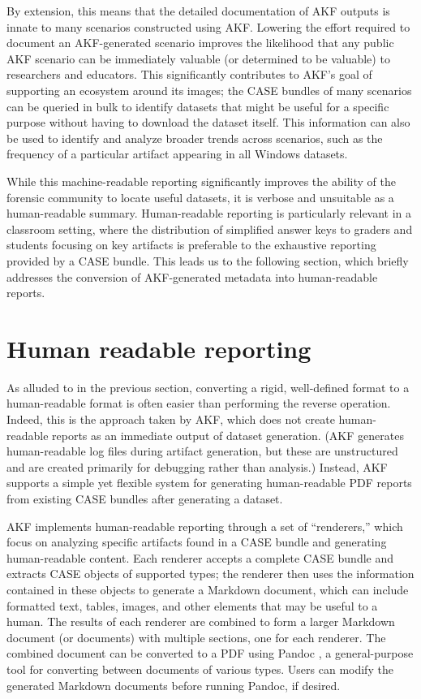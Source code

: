 \documentclass[letterpaper,12pt]{report}
\begin{document}
By extension, this means that the detailed documentation of AKF outputs
is innate to many scenarios constructed using AKF. Lowering the effort
required to document an AKF-generated scenario improves the likelihood
that any public AKF scenario can be immediately valuable (or determined
to be valuable) to researchers and educators. This significantly
contributes to AKF's goal of supporting an ecosystem around its images;
the CASE bundles of many scenarios can be queried in bulk to identify
datasets that might be useful for a specific purpose without having to
download the dataset itself. This information can also be used to
identify and analyze broader trends across scenarios, such as the
frequency of a particular artifact appearing in all Windows datasets.

While this machine-readable reporting significantly improves the ability
of the forensic community to locate useful datasets, it is verbose and
unsuitable as a human-readable summary. Human-readable reporting is
particularly relevant in a classroom setting, where the distribution of
simplified answer keys to graders and students focusing on key artifacts
is preferable to the exhaustive reporting provided by a CASE bundle.
This leads us to the following section, which briefly addresses the
conversion of AKF-generated metadata into human-readable reports.

\section{Human readable reporting}\label{human-readable-reporting}

As alluded to in the previous section, converting a rigid, well-defined
format to a human-readable format is often easier than performing the
reverse operation. Indeed, this is the approach taken by AKF, which does
not create human-readable reports as an immediate output of dataset
generation. (AKF generates human-readable log files during artifact
generation, but these are unstructured and are created primarily for
debugging rather than analysis.) Instead, AKF supports a simple yet
flexible system for generating human-readable PDF reports from existing
CASE bundles after generating a dataset.

AKF implements human-readable reporting through a set of ``renderers,''
which focus on analyzing specific artifacts found in a CASE bundle and
generating human-readable content. Each renderer accepts a complete CASE
bundle and extracts CASE objects of supported types; the renderer then
uses the information contained in these objects to generate a Markdown
document, which can include formatted text, tables, images, and other
elements that may be useful to a human. The results of each renderer are
combined to form a larger Markdown document (or documents) with multiple
sections, one for each renderer. The combined document can be converted
to a PDF using Pandoc \cite{macfarlanePandoc2025}, a general-purpose
tool for converting between documents of various types. Users can modify
the generated Markdown documents before running Pandoc, if desired.
\end{document}
